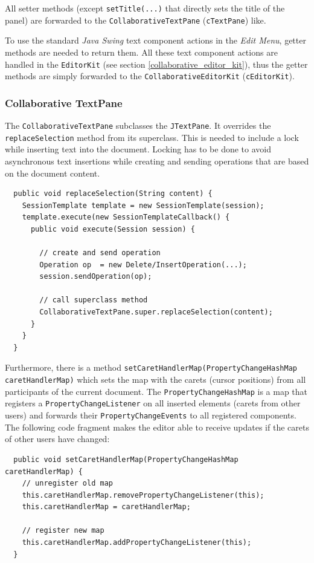 All setter methods (except \texttt{setTitle(...)} that directly sets the title of the panel) are forwarded to the \texttt{Collaborative\-Text\-Pane} (\texttt{cTextPane}) like.

To use the standard \emph{Java Swing} text component actions in the \emph{Edit Menu}, getter methods are needed to return them. All these text component actions are handled in the \texttt{Editor\-Kit} (see section \ref{collaborative_editor_kit}), thus the getter methods are simply forwarded to the \texttt{Collaborative\-Editor\-Kit} (\texttt{cEditorKit}).


\subsubsection{Collaborative TextPane}
The \texttt{Collaborative\-Text\-Pane} subclasses the \texttt{JTextPane}. It overrides the \texttt{replaceSelection} method from its superclass. This is needed to include a lock while inserting text into the document. Locking has to be done to avoid asynchronous text insertions while creating and sending operations that are based on the document content.

\begin{verbatim}
  public void replaceSelection(String content) {
    SessionTemplate template = new SessionTemplate(session);
    template.execute(new SessionTemplateCallback() {
      public void execute(Session session) {

        // create and send operation
        Operation op  = new Delete/InsertOperation(...);
        session.sendOperation(op);

        // call superclass method
        CollaborativeTextPane.super.replaceSelection(content);
      }
    }
  }
\end{verbatim}

Furthermore, there is a method \texttt{setCaretHandlerMap(PropertyChangeHashMap caretHandlerMap)} which sets the map with the carets (cursor positions) from all participants of the current document. The \texttt{PropertyChangeHashMap} is a map that registers a \texttt{PropertyChangeListener} on all inserted elements (carets from other users) and forwards their \texttt{PropertyChangeEvents} to all registered components. The following code fragment makes the editor able to receive updates if the carets of other users have changed:

\begin{verbatim}
  public void setCaretHandlerMap(PropertyChangeHashMap caretHandlerMap) {
    // unregister old map
    this.caretHandlerMap.removePropertyChangeListener(this);
    this.caretHandlerMap = caretHandlerMap;

    // register new map
    this.caretHandlerMap.addPropertyChangeListener(this);
  }
\end{verbatim}

